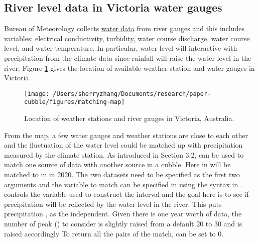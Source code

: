 \documentclass[
]{jss}
\begin{document}
\hypertarget{river-level-data-in-victoria-water-gauges}{%
\subsection{River level data in Victoria water gauges}\label{river-level-data-in-victoria-water-gauges}}

Bureau of Meteorology collects \href{http://www.bom.gov.au/metadata/catalogue/19115/ANZCW0503900528?template=full}{water data} from river gauges and this includes variables: electrical conductivity, turbidity, water course discharge, water course level, and water temperature. In particular, water level will interactive with precipitation from the climate data since rainfall will raise the water level in the river. Figure \ref{fig:matching-map} gives the location of available weather station and water gauges in Victoria.

\begin{CodeChunk}
\begin{figure}

{\centering \texttt{[image: /Users/sherryzhang/Documents/research/paper-cubble/figures/matching-map]} 

}

\caption[Location of weather stations and river gauges in Victoria, Australia]{Location of weather stations and river gauges in Victoria, Australia.}\label{fig:matching-map}
\end{figure}
\end{CodeChunk}

From the map, a few water gauges and weather stations are close to each other and the fluctuation of the water level could be matched up with precipitation measured by the climate station. As introduced in Section 3.2,  can be used to match one source of data with another source in a cubble. Here  in  will be matched to  in  in 2020. The two datasets need to be specified as the first two arguments and the variable to match can be specified in  using the  syntax in .  controls the variable used to construct the interval and the goal here is to see if precipitation will be reflected by the water level in the river. This puts precipitation , as the independent. Given there is one year worth of data, the number of peak () to consider is slightly raised from a default 20 to 30 and  is raised accordingly To return all the pairs of the match,  can be set to 0.
\end{document}
